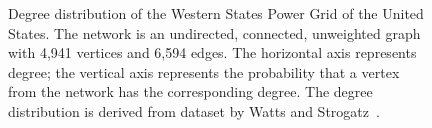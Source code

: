 \begin{figure}[!htbp]
\centering
{}
\qquad
{}
\caption{Degree distribution of the Western States Power Grid of the
  United States. The network is an undirected, connected,
  unweighted graph with 4,941 vertices and 6,594 edges. The horizontal
  axis represents degree; the vertical axis represents the probability
  that a vertex from the network has the corresponding degree. The
  degree distribution is derived from dataset by Watts and
  Strogatz~\cite{WattsStrogatz1998}.}
\label{fig:random_graphs:degree_distribution:power_grid}
\end{figure}

